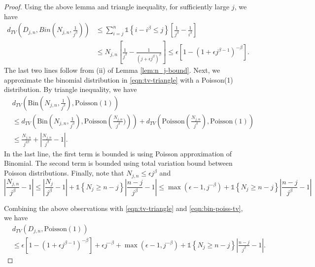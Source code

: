 \documentclass[letterpaper,11pt,reqno]{amsart}
\theoremstyle{definition}
\renewcommand{\leq}{\leqslant}
\renewcommand{\geq}{\geqslant}
\newcommand{\ind}{\mathds{1}}
\newcommand{\abs}[1]{\left\vert#1\right\vert}
\newcommand{\set}[1]{\left\{#1\right\}}
\begin{document}
\begin{proof}
Using the above lemma and triangle inequality, for sufficiently large $j$, we have \begin{align}\label{eqn:tv-triangle}
    d_{TV}\left(D_{j,n}, Bin\left(N_{j,n},\frac{1}{j^{\beta}}\right)\right) &\leq \sum_{i=j}^{n} \ind\set{i-i^\beta \leq j}\left[\frac{1}{j^\beta}-\frac{1}{i^\beta}\right]\nonumber\\
    &\leq N_{j,n} \left[\frac{1}{j^\beta} - \frac{1}{(j+\epsilon j^\beta)^\beta}\right] \leq \epsilon \left[1-(1+\epsilon j^{\beta-1})^{-\beta}\right].
\end{align} The last two lines follow from (ii) of Lemma \ref{lem:n_j-bound}. Next, we approximate the binomial distribution in \eqref{eqn:tv-triangle} with a Poisson(1) distribution. By triangle inequality, we have\begin{align}\label{eqn:bin-poiss-tv}
&d_{TV}\left(\text{Bin}\left(N_{j,n},\frac{1}{j^{\beta}}\right), \text{Poisson}(1)\right) \nonumber\\
    &\leq d_{TV}\left(\text{Bin}\left(N_{j,n},\frac{1}{j^{\beta}}\right), \text{Poisson}\left(\frac{N_{j,n}}{j^\beta})\right)\right) +  d_{TV}\left( \text{Poisson}\left(\frac{N_{j,n}}{j^\beta}\right), \text{Poisson}(1)\right)\nonumber\\
    &\leq \frac{N_{j,n}}{j^{2\beta}} + \abs{\frac{N_{j,n}}{j^\beta}-1}.
\end{align} In the last line, the first term is bounded is using Poisson approximation of Binomial. The second term is bounded using total variation bound between Poisson distributions. Finally, note that $N_{j,n} \leq \epsilon j^{\beta}$ and $$\abs{\frac{N_{j,n}}{j^\beta}-1} \leq \abs{\frac{N_j}{j^\beta}-1}+ \ind\set{N_j\geq n-j} \abs{\frac{n-j}{j^\beta}-1} \leq \max(\epsilon - 1,j^{-\beta}) + \ind\set{N_j\geq n-j} \abs{\frac{n-j}{j^\beta}-1}$$


Combining the above observations with \eqref{eqn:tv-triangle} and \eqref{eqn:bin-poiss-tv}, we have \begin{align*}
    &d_{TV}\left(D_{j,n}, \text{Poisson}(1)\right)\\
    &\leq \epsilon \left[1-(1+\epsilon j^{\beta-1})^{-\beta}\right] + \epsilon j^{-\beta} + \max(\epsilon-1,j^{-\beta})+ \ind\set{N_j\geq n-j} \abs{\frac{n-j}{j^\beta}-1}.
\end{align*} 
\end{proof}
\end{document}
